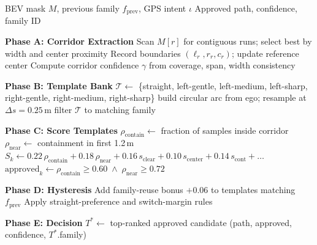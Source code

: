 \documentclass[12pt,letterpaper,oneside]{report}
\begin{document}
\begin{algorithm}[H]
\caption{Template-Approval Planner}
\label{alg:template_approval}
\begin{algorithmic}[1]
\Require BEV mask $M$, previous family $f_{\text{prev}}$, GPS intent $\iota$
\Ensure Approved path, confidence, family ID

\Statex \textbf{Phase A: Corridor Extraction}
    \State Scan $M[r]$ for contiguous runs; select best by width and center proximity
    \State Record boundaries $(\ell_r, r_r, c_r)$; update reference center
\EndFor
\State Compute corridor confidence $\gamma$ from coverage, span, width consistency

\Statex \textbf{Phase B: Template Bank}
\State $\mathcal{T} \gets$ \{straight, left-gentle, left-medium, left-sharp, right-gentle, right-medium, right-sharp\}
 build circular arc from ego; resample at $\Delta s = 0.25$\,m \EndFor
{} filter $\mathcal{T}$ to matching family \EndIf

\Statex \textbf{Phase C: Score Templates}
    \State $\rho_{\text{contain}} \gets$ fraction of samples inside corridor
    \State $\rho_{\text{near}} \gets$ containment in first 1.2\,m
    \State $S_k \gets 0.22\,\rho_{\text{contain}} + 0.18\,\rho_{\text{near}} + 0.16\,s_{\text{clear}} + 0.10\,s_{\text{center}} + 0.14\,s_{\text{cont}} + \ldots$
    \State $\text{approved}_k \gets \rho_{\text{contain}} \ge 0.60 \;\wedge\; \rho_{\text{near}} \ge 0.72$
\EndFor

\Statex \textbf{Phase D: Hysteresis}
\State Add family-reuse bonus $+0.06$ to templates matching $f_{\text{prev}}$
\State Apply straight-preference and switch-margin rules

\Statex \textbf{Phase E: Decision}
\State $T^* \gets$ top-ranked approved candidate
\State \Return (path, approved, confidence, $T^*$.family)
\end{algorithmic}
\end{algorithm}
\end{document}
